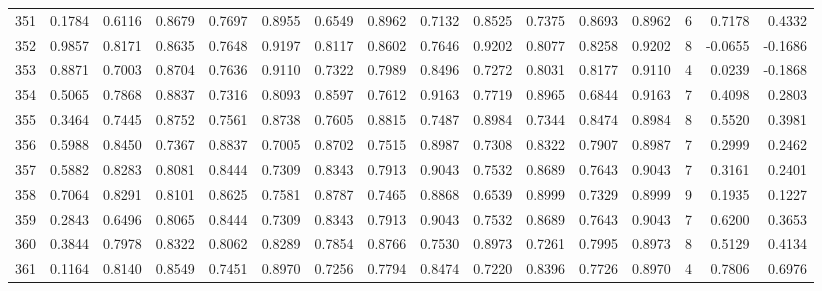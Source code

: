 \begin{tabular}{lrrrrrrrrrrrrrrr}
351 &      0.1784 &  0.6116 &  0.8679 &  0.7697 &  0.8955 &  0.6549 &  0.8962 &  0.7132 &  0.8525 &  0.7375 &   0.8693 &     0.8962 &      6 &                    0.7178 &                     0.4332 \\
352 &      0.9857 &  0.8171 &  0.8635 &  0.7648 &  0.9197 &  0.8117 &  0.8602 &  0.7646 &  0.9202 &  0.8077 &   0.8258 &     0.9202 &      8 &                   -0.0655 &                    -0.1686 \\
353 &      0.8871 &  0.7003 &  0.8704 &  0.7636 &  0.9110 &  0.7322 &  0.7989 &  0.8496 &  0.7272 &  0.8031 &   0.8177 &     0.9110 &      4 &                    0.0239 &                    -0.1868 \\
354 &      0.5065 &  0.7868 &  0.8837 &  0.7316 &  0.8093 &  0.8597 &  0.7612 &  0.9163 &  0.7719 &  0.8965 &   0.6844 &     0.9163 &      7 &                    0.4098 &                     0.2803 \\
355 &      0.3464 &  0.7445 &  0.8752 &  0.7561 &  0.8738 &  0.7605 &  0.8815 &  0.7487 &  0.8984 &  0.7344 &   0.8474 &     0.8984 &      8 &                    0.5520 &                     0.3981 \\
356 &      0.5988 &  0.8450 &  0.7367 &  0.8837 &  0.7005 &  0.8702 &  0.7515 &  0.8987 &  0.7308 &  0.8322 &   0.7907 &     0.8987 &      7 &                    0.2999 &                     0.2462 \\
357 &      0.5882 &  0.8283 &  0.8081 &  0.8444 &  0.7309 &  0.8343 &  0.7913 &  0.9043 &  0.7532 &  0.8689 &   0.7643 &     0.9043 &      7 &                    0.3161 &                     0.2401 \\
358 &      0.7064 &  0.8291 &  0.8101 &  0.8625 &  0.7581 &  0.8787 &  0.7465 &  0.8868 &  0.6539 &  0.8999 &   0.7329 &     0.8999 &      9 &                    0.1935 &                     0.1227 \\
359 &      0.2843 &  0.6496 &  0.8065 &  0.8444 &  0.7309 &  0.8343 &  0.7913 &  0.9043 &  0.7532 &  0.8689 &   0.7643 &     0.9043 &      7 &                    0.6200 &                     0.3653 \\
360 &      0.3844 &  0.7978 &  0.8322 &  0.8062 &  0.8289 &  0.7854 &  0.8766 &  0.7530 &  0.8973 &  0.7261 &   0.7995 &     0.8973 &      8 &                    0.5129 &                     0.4134 \\
361 &      0.1164 &  0.8140 &  0.8549 &  0.7451 &  0.8970 &  0.7256 &  0.7794 &  0.8474 &  0.7220 &  0.8396 &   0.7726 &     0.8970 &      4 &                    0.7806 &                     0.6976 \\

\end{tabular}
